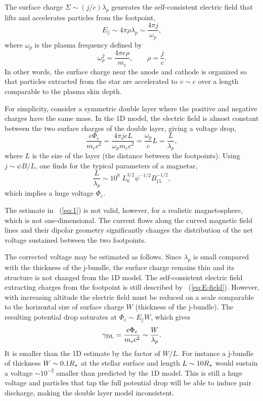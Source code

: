 The surface charge $\Sigma\sim (j/c)\lambda_p$ generates the self-consistent
electric field that lifts and accelerates particles from the footpoint,
\begin{equation}
  \label{eq:E-field}
  E_\parallel\sim 4\pi\rho\lambda_p \sim \frac{4\pi j}{\omega_p},
\end{equation}
where
$\omega_p$ is the plasma frequency defined by
\begin{equation}
\label{eq:omega_p}
  \omega_p^2=\frac{4\pi e\rho}{m_e}, \qquad \rho=\frac{j}{c}.
\end{equation}
In other words, the surface charge near the anode and cathode is organized
so that particles extracted from the star are accelerated to $v\sim c$ over a
length comparable to the plasma skin depth.

For simplicity, consider a symmetric double layer where the positive and
negative charges have the same mass. In the 1D model, the electric field is
almost constant between the two surface charges of the double layer, giving a voltage drop,
\begin{equation}
  \label{eq:1}
  \frac{e\Phi_{e}}{m_{e}c^2} = \frac{4\pi j e L}{\omega_pm_{e}c^{2}} = \frac{\omega_p}{c}L = \frac{L}{\lambda_p},
\end{equation}
where $L$ is the size of the layer (the distance between the footpoints).
Using $j\sim \psi B/L$, one finds for the typical parameters of a magnetar,
\begin{equation}
  \label{eq:1D}
   \frac{L}{\lambda_p} \sim 10^{8}\; L_6^{3/2}\psi^{-1/2} B_{15}^{-1/2},
\end{equation}
which
implies a huge voltage $\Phi_e$.

The estimate in \Eq~(\ref{eq:1}) is not
valid, however, for a realistic
magnetosphere, which is not one-dimensional.
The current flows along the curved magnetic field lines and their dipolar geometry
significantly changes the distribution of
the net voltage
sustained between the two footpoints.

The corrected voltage may be estimated as follows.
Since $\lambda_p$ is small compared with the thickness of the j-bundle,
the surface charge remains thin and its structure is not changed from the 1D model.
The self-consistent electric field extracting charges from the footpoint is still described by
\Eq~(\ref{eq:E-field}). However, with increasing altitude the electric field
must be reduced on a scale comparable to the horizontal size of surface charge
$W$ (thickness of the j-bundle). The resulting potential drop saturates at
$\Phi_e\sim E_\parallel W$, which gives
\begin{equation}
  \label{eq:voltage}
  \gamma_{\rm DL}=\frac{e\Phi_{e}}{m_{e}c^2}
  \sim \frac{W}{\lambda_p}.
\end{equation}
It is smaller than the 1D estimate by the factor of $W/L$. For instance a
j-bundle of thickness $W\sim 0.1R_\star$ at the stellar surface and length $L\sim 10
R_\star$ would sustain a voltage $\sim 10^{-2}$ smaller than predicted by the 1D
model. This is still a huge voltage and particles that tap the full potential
drop will be able to induce pair discharge, making the double layer model
inconsistent.

